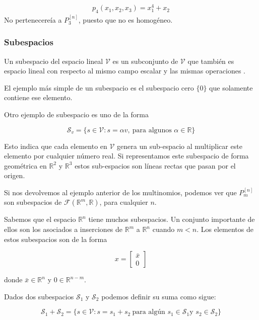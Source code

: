 \begin{eqnarray*}
p_4(x_1,x_2,x_3) = x_1^4+x_2
\end{eqnarray*}
No pertenecereía a $P_{3}^{[n]}$, puesto que no es homogéneo.

\subsubsection{Subespacios}

Un subespacio  del espacio lineal $\mathcal{V}$ es un subconjunto de $\mathcal{V}$  que también es espacio lineal con respecto al mismo campo escalar y las mismas operaciones . 

El ejemplo más simple de un subespacio es el subespacio cero $\{0\}$ que solamente contiene ese elemento.

Otro ejemplo de subespacio es uno de la forma

\begin{equation*}
\mathcal{S}_v = \{ s \in \mathcal{V}: s = \alpha v, \ \text{para algunos } \alpha \in \mathbb{R}\}
\end{equation*}

Esto indica que cada elemento en $\mathcal{V}$ genera un sub-espacio al multiplicar este elemento por cualquier número real. Si representamos este subespacio de forma geométrica en $\mathbb{R}^2$ y $\mathbb{R}^3$ estos sub-espacios son líneas rectas que pasan por el origen.

Si nos devolvemos al ejemplo anterior de los multinomios, podemos ver que $P_{m}^{[n]}$ son subespacios de $\mathcal{F}(\mathbb{R}^m,\mathbb{R})$, para cualquier $n$.

Sabemos que el espacio $\mathbb{R}^n$ tiene muchos subespacios. Un conjunto importante de ellos son los asociados a inserciones de $\mathbb{R}^m$ a $\mathbb{R}^n$ cuando $m<n$. Los elementos de estos subespacios son de la forma

\begin{equation*}
x = \left[\begin{array}{c}
     \bar{x}  \\
     0 
\end{array}  \right]
\end{equation*}

donde $\bar{x} \in \mathbb{R}^n$ y $0 \in \mathbb{R}^{n-m}$.

Dados dos subespacios $\mathcal{S}_1$ y $\mathcal{S}_2$ podemos definir su suma como sigue:

\begin{equation*}
 \mathcal{S}_1 +\mathcal{S}_2 = \{ s \in \mathcal{V} : s = s_1+s_2 \ \text{para algún } s_1 \in \mathcal{S}_1 \text{y } s_2 \in \mathcal{S}_2\}
\end{equation*}

